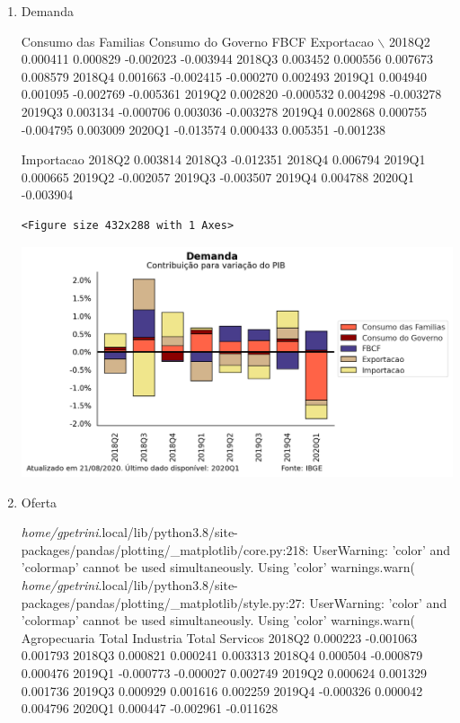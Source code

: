 \documentclass[11pt]{article}
\begin{document}
\begin{enumerate}
\item Demanda
\label{sec:org42cfd1f}

        Consumo das Familias  Consumo do Governo      FBCF  Exportacao  $\backslash$
2018Q2              0.000411            0.000829 -0.002023   -0.003944   
2018Q3              0.003452            0.000556  0.007673    0.008579   
2018Q4              0.001663           -0.002415 -0.000270    0.002493   
2019Q1              0.004940            0.001095 -0.002769   -0.005361   
2019Q2              0.002820           -0.000532  0.004298   -0.003278   
2019Q3              0.003134           -0.000706  0.003036   -0.003278   
2019Q4              0.002868            0.000755 -0.004795    0.003009   
2020Q1             -0.013574            0.000433  0.005351   -0.001238   

        Importacao  
2018Q2    0.003814  
2018Q3   -0.012351  
2018Q4    0.006794  
2019Q1    0.000665  
2019Q2   -0.002057  
2019Q3   -0.003507  
2019Q4    0.004788  
2020Q1   -0.003904  

\begin{verbatim}
<Figure size 432x288 with 1 Axes>
\end{verbatim}


\begin{center}
\includegraphics[width=.9\linewidth]{obipy-resources/62e383af79e91b63c7fc98dd7fb55b3c3ececcb9/b4e59aefc47c0f6b4ca741d61ebe4e966de134e8.png}
\end{center}

\item Oferta
\label{sec:org7c54ad0}

\emph{home/gpetrini}.local/lib/python3.8/site-packages/pandas/plotting/\_matplotlib/core.py:218: UserWarning: 'color' and 'colormap' cannot be used simultaneously. Using 'color'
  warnings.warn(
\emph{home/gpetrini}.local/lib/python3.8/site-packages/pandas/plotting/\_matplotlib/style.py:27: UserWarning: 'color' and 'colormap' cannot be used simultaneously. Using 'color'
  warnings.warn(
        Agropecuaria  Total Industria  Total Servicos
2018Q2      0.000223        -0.001063        0.001793
2018Q3      0.000821         0.000241        0.003313
2018Q4      0.000504        -0.000879        0.000476
2019Q1     -0.000773        -0.000027        0.002749
2019Q2      0.000624         0.001329        0.001736
2019Q3      0.000929         0.001616        0.002259
2019Q4     -0.000326         0.000042        0.004796
2020Q1      0.000447        -0.002961       -0.011628


\end{enumerate}
\end{document}
